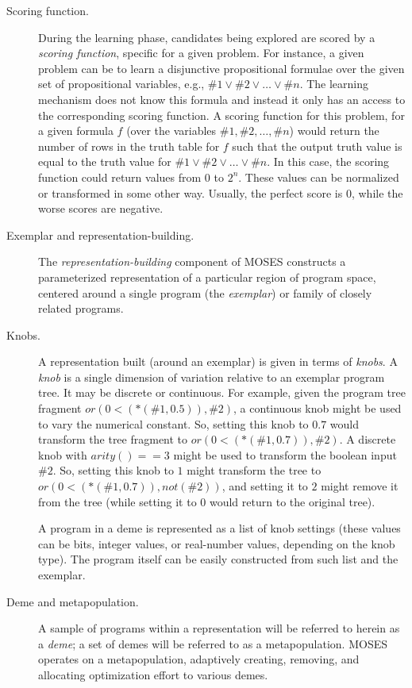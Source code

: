 \documentclass{article}
\begin{document}
\begin{description}

\item[Scoring function.] During the learning phase, candidates being explored are scored 
by a {\em scoring function}, specific for a given problem. 
For instance, a given problem can be to learn a disjunctive 
propositional formulae over the given set of propositional 
variables, e.g., $\#1 \vee \#2 \vee \ldots \vee \#n$. 
The learning mechanism does not know this formula and instead
it only has an access to the corresponding scoring function.
A scoring function for this problem, for a given formula 
$f$ (over the variables $\#1, \#2, \ldots, \#n$) would return 
the number of rows in the truth table for $f$ such that 
the output truth value is equal to the truth value for 
$\#1 \vee \#2 \vee \ldots \vee \#n$. In this case, the 
scoring function could return values from $0$ to $2^n$. 
These values can be normalized or transformed in some other
way. Usually, the perfect score is $0$, while the worse 
scores are negative. 

\item[Exemplar and representation-building.] 
The {\em representation-building} component of MOSES constructs a 
parameterized representation of a particular region of program 
space, centered around a single program (the {\em exemplar}) or 
family of closely related programs. 

\item[Knobs.] 
A representation built (around an exemplar) is given in terms 
of {\em knobs}. A {\em knob} is a single dimension of variation 
relative to an exemplar program tree. It may be discrete or 
continuous. For example, given the program tree fragment 
$or(0<(*(\#1,0.5)),\#2)$, a continuous knob might be used to 
vary the numerical constant. So, setting this knob to $0.7$ would 
transform the tree fragment to $or(0<(*(\#1,0.7)),\#2)$. A discrete 
knob with $arity()==3$ might be used to transform the boolean input 
$\#2$. So, setting this knob to $1$ might transform the tree to 
$or(0<(*(\#1,0.7)),not(\#2))$, and setting it to $2$ might remove 
it from the tree (while setting it to $0$ would return to the 
original tree).

A program in a deme is represented as a list of knob settings
(these values can be bits, integer values, or real-number values,
depending on the knob type). The program itself can be easily 
constructed from such list and the exemplar.

\item[Deme and metapopulation.] 
A sample of programs within a representation will be referred to 
herein as a {\em deme}; a set of demes will be referred to as a 
metapopulation. MOSES operates on a metapopulation, adaptively 
creating, removing, and allocating optimization effort to 
various demes. 
\end{description}
\end{document}
